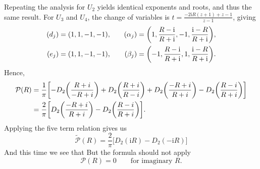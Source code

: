 \documentclass[11pt, a4paper]{article}
\newcommand{\ii}{\mathrm{i}}
\newcommand{\Li}{\operatorname{Li}}
\def\bp#1{{\color{red} #1}}
\numberwithin{equation}{section}
\begin{document}
Repeating the analysis for $U_2$ yields identical exponents and roots, and thus the same result. For $U_3$ and $U_4$, the change of variables is $t = \frac{-2 \ii R (z+1)+z-1}{z-1}$, giving
\begin{equation}
  \begin{aligned}
    (d_j) &= (1, 1, -1, -1), &\quad
    (\alpha_j) = \qty(1,\frac{R-\ii}{R+\ii},-1,\frac{\ii-R}{R+\ii}), \\
    (e_j) &= (1, 1, -1, -1), &\quad
    (\beta_j) = \qty(-1,\frac{R-\ii}{R+\ii},1,\frac{\ii-R}{R+\ii}).
  \end{aligned}
\end{equation}
Hence,
\begin{equation}\label{eq:imagPeriod}
  \begin{aligned}
    \mathcal{P}(R)
    &= \frac{1}{\pi}\qty[-D_2\!\left(\frac{R+i}{-R+i}\right)
      + D_2\!\left(\frac{R+i}{R-i}\right)
      + D_2\!\left(\frac{-R+i}{R+i}\right)
      - D_2\!\left(\frac{R-i}{R+i}\right)] \\
    &= \frac{2}{\pi} \qty[D_2\!\left(\frac{-R+i}{R+i}\right)
      - D_2\!\left(\frac{R-i}{R+i}\right)].
  \end{aligned}
\end{equation}
Applying the five term relation gives us
\begin{equation}
  \mathcal{\tilde{P}}(R) = \frac{2}{\pi} \bigl[D_2(\ii R)-D_2(-\ii R)\bigr]
\end{equation}
And this time we see that \bp{But the formula should not apply}
\begin{equation}
  \mathcal{P}(R) = 0 \qquad \text{for imaginary } R.
\end{equation}

\end{document}
